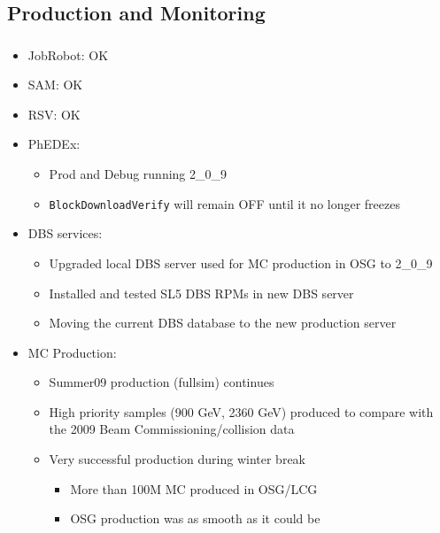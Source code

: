 \documentclass{beamer}
\begin{document}
\subsection{Production and Monitoring}
\begin{frame}
\frametitle{}

\begin{itemize}
	\item JobRobot: OK
	\item SAM: OK
	\item RSV: OK
	\item PhEDEx:
	\begin{itemize}
		\item Prod and Debug running 2\_0\_9
		\item {\tt BlockDownloadVerify} will remain OFF until it no longer freezes
	\end{itemize}
	\item DBS services:
	\begin{itemize}
		\item Upgraded local DBS server used for MC production in OSG to 2\_0\_9
		\item Installed and tested SL5 DBS RPMs in new DBS server
		\item Moving the current DBS database to the new production server
	\end{itemize}
	\item MC Production:
	\begin{itemize}
		\item Summer09 production (fullsim) continues
		\item High priority samples (900 GeV, 2360 GeV) produced to compare with the 2009 Beam Commissioning/collision data
		\item Very successful production during winter break
		\begin{itemize}
			\item More than 100M MC produced in OSG/LCG
			\item OSG production was as smooth as it could be
		\end{itemize}
	\end{itemize}
\end{itemize}
\end{frame}
\end{document}
